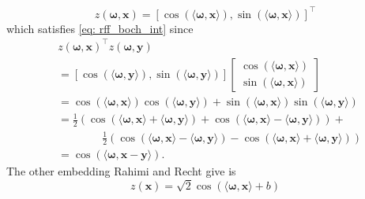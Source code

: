 \begin{equation} \label{eq: rff_emb}
    z \left( \bm{\omega}, \bm{x} \right) = \left[ \cos \left( \langle \bm{\omega} , \bm{x} \rangle \right) , \sin \left( \langle \bm{\omega} , \bm{x} \rangle \right) \right]^{\intercal}
\end{equation}
which satisfies \ref{eq: rff_boch_int} since
\begin{align*}
     & z \left( \bm{\omega}, \bm{x} \right)^{\intercal} z \left( \bm{\omega}, \bm{y} \right)                                                                                                                                                      \\
     & =
    \left[ \cos \left( \langle \bm{\omega} , \bm{y} \rangle \right), \sin \left( \langle \bm{\omega} , \bm{y} \rangle \right)  \right]
    \begin{bmatrix}
        \cos \left( \langle \bm{\omega} , \bm{x} \rangle \right) \\ \sin \left( \langle \bm{\omega} , \bm{x} \rangle \right)
    \end{bmatrix}                                                                                                                                                                                                                     \\
     & = \cos \left( \langle \bm{\omega} , \bm{x} \rangle \right) \cos \left( \langle \bm{\omega} , \bm{y} \rangle \right) + \sin \left( \langle \bm{\omega} , \bm{x} \rangle \right) \sin \left( \langle \bm{\omega} , \bm{y} \rangle \right)    \\
     & = \frac{1}{2} \left( \cos \left( \langle \bm{\omega} , \bm{x} \rangle + \langle \bm{\omega} , \bm{y} \rangle \right) + \cos \left( \langle \bm{\omega} , \bm{x} \rangle - \langle \bm{\omega} , \bm{y} \rangle \right) \right) +           \\
     & \qquad \qquad \frac{1}{2} \left( \cos \left( \langle \bm{\omega} , \bm{x} \rangle - \langle \bm{\omega} , \bm{y} \rangle \right) - \cos \left( \langle \bm{\omega} , \bm{x} \rangle + \langle \bm{\omega} , \bm{y} \rangle \right) \right) \\
     & = \cos \left( \langle \bm{\omega} , \bm{x} - \bm{y} \rangle \right).
\end{align*}
The other embedding Rahimi and Recht give is
\begin{equation} \label{eq: rff_emb_alt}
    z (\bm{x}) = \sqrt{2} \cos \left(  \langle \bm{\omega} , \bm{x} \rangle + b \right)
\end{equation}
